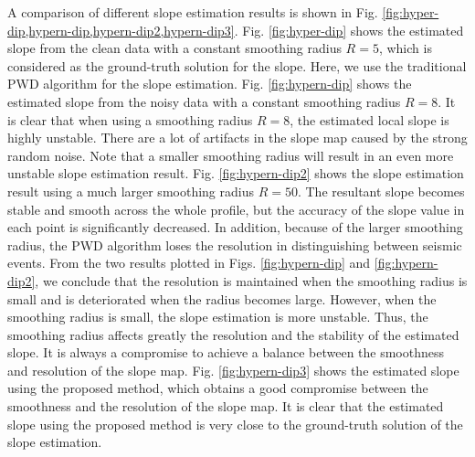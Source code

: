 A comparison of different slope estimation results is shown in Fig. \ref{fig:hyper-dip,hypern-dip,hypern-dip2,hypern-dip3}. Fig. \ref{fig:hyper-dip} shows the estimated slope from the clean data with a constant smoothing radius $R=5$, which is considered as the ground-truth solution for the slope. Here, we use the traditional PWD algorithm \cite{fomel2002pwd} for the slope estimation.  Fig. \ref{fig:hypern-dip} shows the estimated slope from the noisy data with a constant smoothing radius $R=8$. It is clear that when using a smoothing radius $R=8$, the estimated local slope is highly unstable. There are a lot of artifacts in the slope map caused by the strong random noise. Note that a smaller smoothing radius will result in an even more unstable slope estimation result.  Fig. \ref{fig:hypern-dip2} shows the slope estimation result using a much larger smoothing radius $R=50$.  The resultant slope becomes stable and smooth across the whole profile, but the accuracy of the slope value in each point is significantly decreased. In addition, because of the larger smoothing radius, the PWD algorithm loses the resolution in distinguishing between seismic events. From the two results plotted in Figs. \ref{fig:hypern-dip} and \ref{fig:hypern-dip2}, we conclude that the resolution is maintained when the smoothing radius is small and is deteriorated when the radius becomes large. However, when the smoothing radius is small, the slope estimation is more unstable. Thus, the smoothing radius affects greatly the resolution and the stability of the estimated slope. It is always a compromise to achieve a balance between the smoothness and resolution of the slope map. Fig. \ref{fig:hypern-dip3} shows the estimated slope using the proposed method, which obtains a good compromise between the smoothness and the resolution of the slope map.  It is clear that the estimated slope using the proposed method is very close to the ground-truth solution of the slope estimation. 
 
